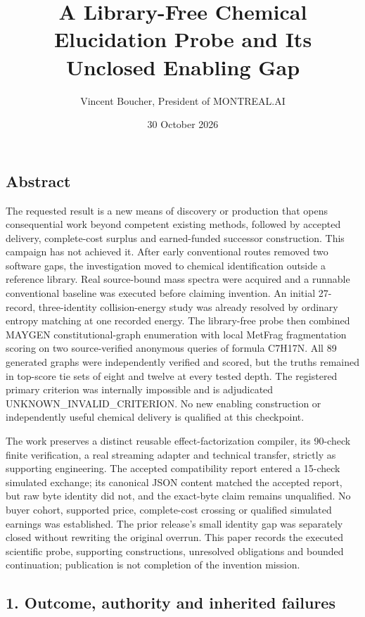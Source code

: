 \documentclass[
  10pt,
]{article}
\title{A Library-Free Chemical Elucidation Probe and Its Unclosed
Enabling Gap}
\author{Vincent Boucher, President of MONTREAL.AI}
\date{30 October 2026}
\begin{document}
\maketitle

\hypertarget{abstract}{%
\subsection{Abstract}\label{abstract}}

The requested result is a new means of discovery or production that
opens consequential work beyond competent existing methods, followed by
accepted delivery, complete-cost surplus and earned-funded successor
construction. This campaign has not achieved it. After early
conventional routes removed two software gaps, the investigation moved
to chemical identification outside a reference library. Real
source-bound mass spectra were acquired and a runnable conventional
baseline was executed before claiming invention. An initial 27-record,
three-identity collision-energy study was already resolved by ordinary
entropy matching at one recorded energy. The library-free probe then
combined MAYGEN constitutional-graph enumeration with local MetFrag
fragmentation scoring on two source-verified anonymous queries of
formula C7H17N. All 89 generated graphs were independently verified and
scored, but the truths remained in top-score tie sets of eight and
twelve at every tested depth. The registered primary criterion was
internally impossible and is adjudicated UNKNOWN\_INVALID\_CRITERION. No
new enabling construction or independently useful chemical delivery is
qualified at this checkpoint.

The work preserves a distinct reusable effect-factorization compiler,
its 90-check finite verification, a real streaming adapter and technical
transfer, strictly as supporting engineering. The accepted compatibility
report entered a 15-check simulated exchange; its canonical JSON content
matched the accepted report, but raw byte identity did not, and the
exact-byte claim remains unqualified. No buyer cohort, supported price,
complete-cost crossing or qualified simulated earnings was established.
The prior release's small identity gap was separately closed without
rewriting the original overrun. This paper records the executed
scientific probe, supporting constructions, unresolved obligations and
bounded continuation; publication is not completion of the invention
mission.

\hypertarget{outcome-authority-and-inherited-failures}{%
\subsection{1. Outcome, authority and inherited
failures}\label{outcome-authority-and-inherited-failures}}
\end{document}
